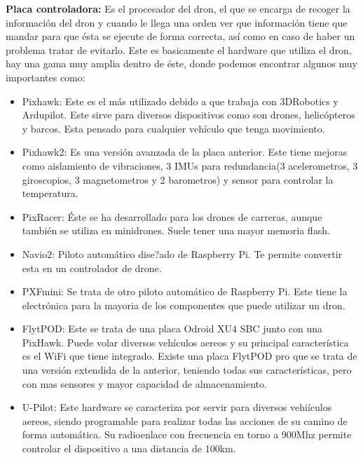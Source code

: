 \hspace{1 cm}\textbf{Placa controladora:} Es el procesador del dron, el que se encarga de recoger la informaci\'on del dron y cuando le llega una orden ver que informaci\'on tiene que mandar para que \'esta se ejecute de forma correcta, as\'i como en caso de haber un problema tratar de evitarlo. Este es basicamente el hardware que utiliza el dron, hay una gama muy amplia dentro de \'este, donde podemos encontrar algunos muy importantes como: 
	\begin{itemize}
		\item Pixhawk: Este es el m\'as utilizado debido a que trabaja con 3DRobotics y Ardupilot. Este sirve para diversos dispositivos como son drones, helic\'opteros y barcos. Esta pensado para cualquier veh\'iculo que tenga movimiento. 

		\item Pixhawk2: Es una versi\'on avanzada de la placa anterior. Este tiene mejoras como aislamiento de vibraciones, 3 IMUs para redundancia(3 acelerometros, 3 giroscopios, 3 magnetometros y 2 barometros) y sensor para controlar la temperatura. 

		\item PixRacer: \'Este se ha desarrollado para los drones de carreras, aunque tambi\'en se utiliza en minidrones. Suele tener una mayor memoria flash.

		\item Navio2: Piloto autom\'atico dise?ado de Raspberry Pi. Te permite convertir esta en un controlador de drone. 

		\item PXFmini: Se trata de otro piloto autom\'atico de Raspberry Pi. Este tiene la electr\'onica para la mayoria de los componentes que puede utilizar un dron. 

		\item FlytPOD: Este se trata de una placa Odroid XU4 SBC junto con una PixHawk. Puede volar diversos veh\'iculos aereos y su principal caracter\'istica es el WiFi que tiene integrado. Existe una placa FlytPOD pro que se trata de una versi\'on extendida de la anterior, teniendo todas sus caracter\'isticas, pero con mas sensores y mayor capacidad de almacenamiento. 

		\item U-Pilot: Este hardware se caracteriza por servir para diversos vehi\'iculos aereos, siendo programable para realizar todas las acciones de su camino de forma autom\'atica. Su radioenlace con frecuencia en torno a 900Mhz permite controlar el dispositivo a una distancia de 100km. 
	\end{itemize}


